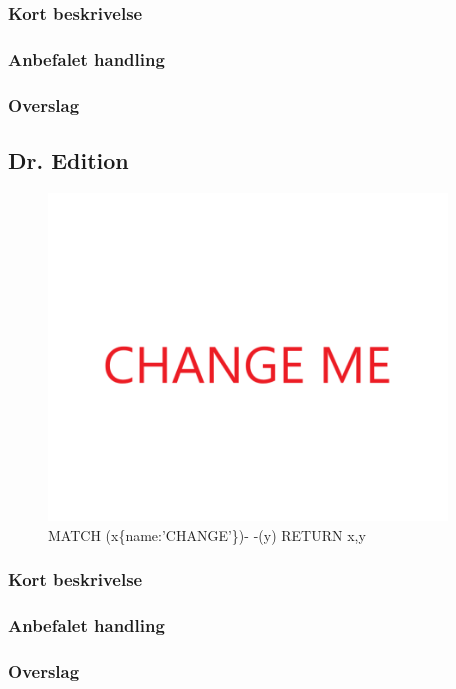 \documentclass{article}
\begin{document}
\subsubsection{Kort beskrivelse}
\subsubsection{Anbefalet handling}
\subsubsection{Overslag}
\subsection{Dr. Edition}
\begin{figure}[h]
\includegraphics[width=300pt]{CHANGE.PNG}
\caption{MATCH (x\{name:'CHANGE'\})- -(y) RETURN x,y}
\end{figure}
\subsubsection{Kort beskrivelse}
\subsubsection{Anbefalet handling}
\subsubsection{Overslag}
\end{document}
